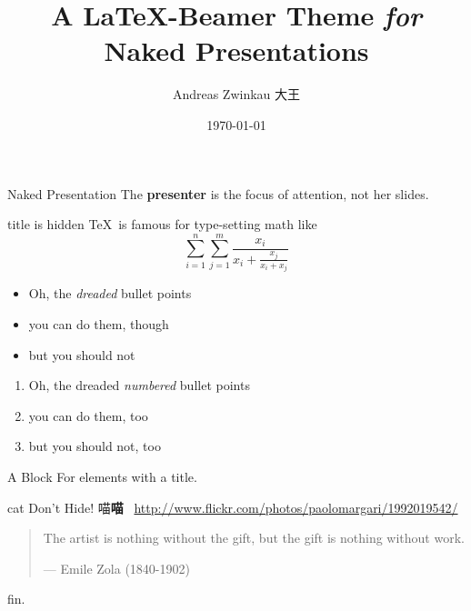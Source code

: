 \documentclass[english,german]{beamer}
\title{A \LaTeX-Beamer Theme {\itshape for} Naked Presentations}
\date{\today}
\author{Andreas Zwinkau \quad 大王}
\begin{document}
\titlepage

\begin{defnframe}{Naked Presentation}
The \textbf{presenter} is the focus of attention,
not her slides.
\end{defnframe}

\begin{frame}{title is hidden}
\TeX\ is famous for type-setting math like \[
   \sum_{i=1}^{n}\sum_{j=1}^{m} 
   \frac{x_i}{x_i + \frac{x_j}{x_i+x_j}}
\]
\end{frame}

\begin{frame}
\begin{itemize}
   \item Oh, the {\itshape dreaded} bullet points
   \item you can do them, though
   \item but you should not
\end{itemize}
\end{frame}

\begin{frame}
\begin{enumerate}
   \item Oh, the dreaded \emph{numbered} bullet points
   \item you can do them, too
   \item but you should not, too
\end{enumerate}
\end{frame}

\begin{frame}
\begin{block}{A Block}
   For elements with a title.
\end{block}
\end{frame}

\begin{imageframe}{cat}
   \color{black}
   {\Large Don't Hide! 喵\textbf{喵}}
   \vskip6.5cm
   \hfill {\tiny\textcopyright~\url{http://www.flickr.com/photos/paolomargari/1992019542/}}
\end{imageframe}

\begin{frame}
\begin{quote}
   The artist is nothing without the gift, but the gift is nothing without work.

   \hfill--- Emile Zola (1840-1902)
\end{quote}
\end{frame}

\emptyslide

\begin{wordframe}
fin.
\end{wordframe}
\end{document}
